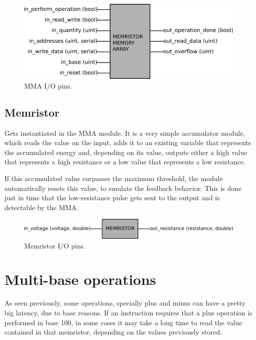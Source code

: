 \documentclass[ecp,tc,english]{iiufrgs}
\begin{document}
\begin{figure}
  \caption{MMA I/O pins.}
  \centerline{\includegraphics{fig/mma.png}}
  \label{fig:mma}
\end{figure}

\section{Memristor}

Gets instantiated in the MMA module. It is a very simple accumulator module, which reads the value on the input, adds it to an existing variable that represents the accumulated energy and, depending on its value, outputs either a high value that represents a high resistance or a low value that represents a low resistance.

If this accumulated value surpasses the maximum threshold, the module automatically resets this value, to emulate the feedback behavior. This is done just in time that the low-resistance pulse gets sent to the output and is detectable by the MMA.

\begin{figure}
  \caption{Memristor I/O pins.}
  \centerline{\includegraphics{fig/mrarch.png}}
  \label{fig:mrarch}
\end{figure}


\chapter{Multi-base operations}

As seen previously, some operations, specially plus and minus can have a pretty big latency, due to base reasons. If an instruction requires that a plus operation is performed in base 100, in some cases it may take a long time to read the value contained in that memristor, depending on the values previously stored.
\end{document}
